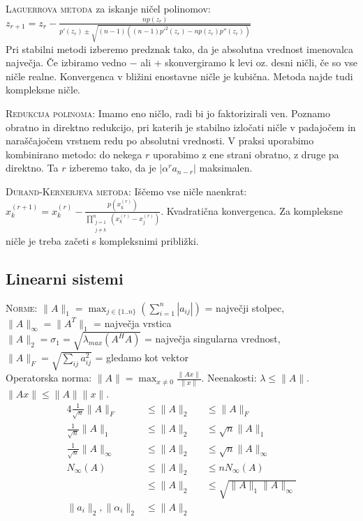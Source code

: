\documentclass[a4paper,10pt]{article}
\theoremstyle{definition}
\begin{document}
\textsc{Laguerrova metoda} za iskanje ničel polinomov: $z_{r+1} = z_r -
\frac{np(z_r)}{p'(z_r) \pm \sqrt{(n-1)((n-1)p'^2(z_r) - np(z_r)p''(z_r))}}$ \\
Pri stabilni metodi izberemo predznak tako, da je absolutna vrednost imenovalca
največja. Če izbiramo vedno $-$ ali  + skonvergiramo k levi oz. desni ničli, če
so vse ničle realne. Konvergenca v bližini enostavne ničle je kubična. Metoda
najde tudi kompleksne ničle.

\textsc{Redukcija polinoma:} Imamo eno ničlo, radi bi jo faktorizirali ven.
Poznamo obratno in direktno redukcijo, pri katerih je stabilno izločati ničle v
padajočem in naraščajočem vrstnem redu po absolutni vrednosti. V praksi
uporabimo kombinirano metodo: do nekega $r$ uporabimo z ene strani obratno, z
druge pa direktno. Ta $r$ izberemo tako, da je $|\alpha^ra_{n-r}|$ maksimalen.

\textsc{Durand-Kernerjeva metoda:} Iščemo vse ničle naenkrat: $x_k^{(r+1)} =
x_k^{(r)} - \frac{p(x_k^{(r)})}{\prod_{\substack{j=1 \\ j \neq
k}}^n (x_k^{(r)} - x_j^{(r)})}$. Kvadratična konvergenca. Za kompleksne ničle je
treba začeti s kompleksnimi približki.


\subsection*{Linearni sistemi}

\textsc{Norme:} $\|A\|_1 =
\max_{j\in\{1..n\}}\left(\sum_{i=1}^n|a_{ij}|\right)$ = največji stolpec,
$\|A\|_\infty = \|A^T\|_1$ = največja vrstica \\
$\|A\|_2 = \sigma_1 = \sqrt{\lambda_{max}(A^HA)}$ = največja singularna vrednost,
$\|A\|_F = \sqrt{\sum_{ij}a_{ij}^2}$ = gledamo kot vektor \\
Operatorska norma: $\|A\| = \max_{x\neq 0}\frac{\|Ax\|}{\|x\|}$. 
Neenakosti: $\lambda \leq \|A\|$. $\|Ax\| \leq \|A\|\|x\|$.
\begin{alignat*}{4}
\textstyle \frac{1}{\sqrt{n}}\|A\|_F &\leq \|A\|_2 &&\leq \|A\|_F \\
\textstyle \frac{1}{\sqrt{n}}\|A\|_1 &\leq \|A\|_2 &&\leq \sqrt{n} \|A\|_1 \\
\textstyle \frac{1}{\sqrt{n}}\|A\|_\infty &\leq \|A\|_2 &&\leq \sqrt{n} \|A\|_\infty \\
N_\infty(A) &\leq \|A\|_2 &&\leq nN_\infty(A) \\
            &\leq \|A\|_2 &&\leq \sqrt{\|A\|_1\|A\|_\infty} \\
\|a_i\|_2, \|\alpha_i\|_2 &\leq \|A\|_2 &&
\end{alignat*}
\end{document}
